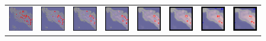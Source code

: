\documentclass{itatnew}
\begin{document}
\begin{figure}[htp]
\begin{tabular}{cccccccc}
    \includegraphics[width=4.6em]{images/gen-demo-zoom-gstar-1}&
    \includegraphics[width=4.6em]{images/gen-demo-zoom-gstar-2}&
    \includegraphics[width=4.6em]{images/gen-demo-zoom-gstar-3}&
    \includegraphics[width=4.6em]{images/gen-demo-zoom-gstar-4}&
    \includegraphics[width=4.6em]{images/gen-demo-zoom-gstar-5}&
    \includegraphics[width=4.6em]{images/gen-demo-zoom-gstar-6}&
    \includegraphics[width=4.6em]{images/gen-demo-zoom-gstar-7}&
    \includegraphics[width=4.6em]{images/gen-demo-zoom-gstar-8}\\
    
  \end{tabular}
  

\end{figure}
\end{document}
